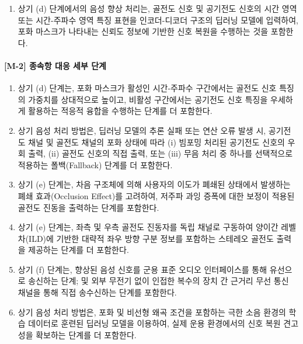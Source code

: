 \documentclass{article}
\begin{document}
\begin{enumerate}[label = \textbf{(M.1.\arabic*)}]
    \item 상기 (d) 단계에서의 음성 향상 처리는, 골전도 신호 및 공기전도 신호의 시간 영역 또는 시간-주파수 영역 특징 표현을 인코더-디코더 구조의 딥러닝 모델에 입력하여, 포화 마스크가 나타내는 신뢰도 정보에 기반한 신호 복원을 수행하는 것을 포함한다.

\end{enumerate}


\paragraph{[M-2] 종속항 대응 세부 단계}

\begin{enumerate}[label = \textbf{(M.2.\arabic*)}]

    \item 상기 (d) 단계는, 포화 마스크가 활성인
    시간-주파수 구간에서는 골전도 신호 특징의 가중치를
    상대적으로 높이고, 비활성 구간에서는 공기전도 신호
    특징을 우세하게 활용하는 적응적 융합을 수행하는
    단계를 더 포함한다.

    \item 상기 음성 처리 방법은, 딥러닝 모델의 추론
    실패 또는 연산 오류 발생 시, 공기전도 채널 및 골전도 채널의 포화 상태에 따라 (i) 빔포밍 처리된 공기전도 신호의 우회 출력, (ii) 골전도 신호의 직접 출력, 또는 (iii) 무음 처리 중 하나를 선택적으로 적용하는 폴백(Fallback)
    단계를 더 포함한다.

    \item 상기 (e) 단계는, 차음 구조체에 의해 사용자의
    이도가 폐쇄된 상태에서 발생하는 폐쇄 효과(Occlusion Effect)를 고려하여, 저주파 과잉 증폭에 대한 보정이 적용된 골전도
    진동을 출력하는 단계를 포함한다.

    \item 상기 (e) 단계는, 좌측 및 우측 골전도 진동자를
    독립 채널로 구동하여 양이간 레벨차(ILD)에 기반한 대략적 좌우 방향 구분 정보를 포함하는 스테레오 골전도 출력을
    제공하는 단계를 더 포함한다.

    \item 상기 (f) 단계는, 향상된 음성 신호를 군용
    표준 오디오 인터페이스를 통해 유선으로 송신하는
    단계; 및 외부 무전기 없이 인접한 복수의 장치
    간 근거리 무선 통신 채널을 통해 직접 송수신하는
    단계를 포함한다.

    \item 상기 음성 처리 방법은, 포화 및 비선형 왜곡
    조건을 포함하는 극한 소음 환경의 학습 데이터로
    훈련된 딥러닝 모델을 이용하여, 실제 운용 환경에서의
    신호 복원 견고성을 확보하는 단계를 더 포함한다.


\end{enumerate}
\end{document}
